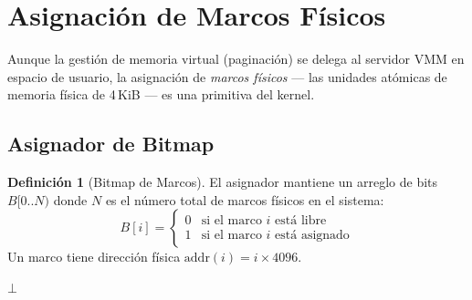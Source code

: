 \documentclass[11pt,twoside,openright]{book}
\theoremstyle{definition}
\newtheorem{definition}{Definición}[chapter]
\theoremstyle{plain}
\theoremstyle{remark}
\begin{document}
\section{Asignación de Marcos Físicos}
\label{sec:frame-alloc}

Aunque la gestión de memoria virtual (paginación) se delega al servidor VMM en espacio
de usuario, la asignación de \emph{marcos físicos} --- las unidades atómicas de memoria
física de 4\,KiB --- es una primitiva del kernel.

\subsection{Asignador de Bitmap}

\begin{definition}[Bitmap de Marcos]
\label{def:frame-bitmap}
El asignador mantiene un arreglo de bits $B[0..N)$ donde $N$ es el número total de marcos
físicos en el sistema:
\[
    B[i] = \begin{cases}
        0 & \text{si el marco } i \text{ está libre} \\
        1 & \text{si el marco } i \text{ está asignado}
    \end{cases}
\]
Un marco tiene dirección física $\text{addr}(i) = i \times 4096$.
\end{definition}

\begin{algorithm}[H]
\caption{\textsc{Frame-Alloc}$(B)$: Asignar un marco físico libre.}
\label{alg:frame-alloc}
\Return $\bot$
\end{algorithm}
\end{document}
